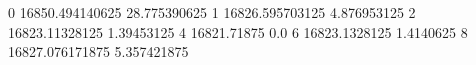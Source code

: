 0 16850.494140625 28.775390625
1 16826.595703125 4.876953125
2 16823.11328125 1.39453125
4 16821.71875 0.0
6 16823.1328125 1.4140625
8 16827.076171875 5.357421875
